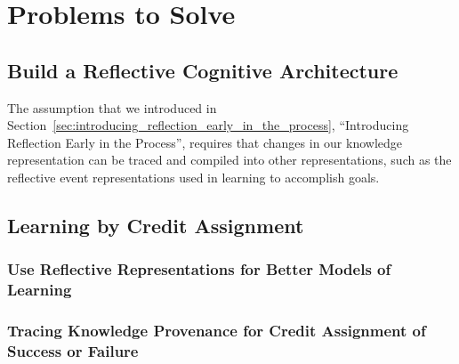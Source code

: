 \chapter{Problems to Solve}\label{ch:problems_to_solve}

\section{Build a Reflective Cognitive Architecture}

The assumption that we introduced in
Section~\ref{sec:introducing_reflection_early_in_the_process},
``Introducing Reflection Early in the Process'', requires that changes
in our knowledge representation can be traced and compiled into other
representations, such as the reflective event representations used in
learning to accomplish goals.


\section{Learning by Credit Assignment}

\subsection{Use Reflective Representations for Better Models of Learning}

\subsection{Tracing Knowledge Provenance for Credit Assignment of Success or Failure}

\section{}



